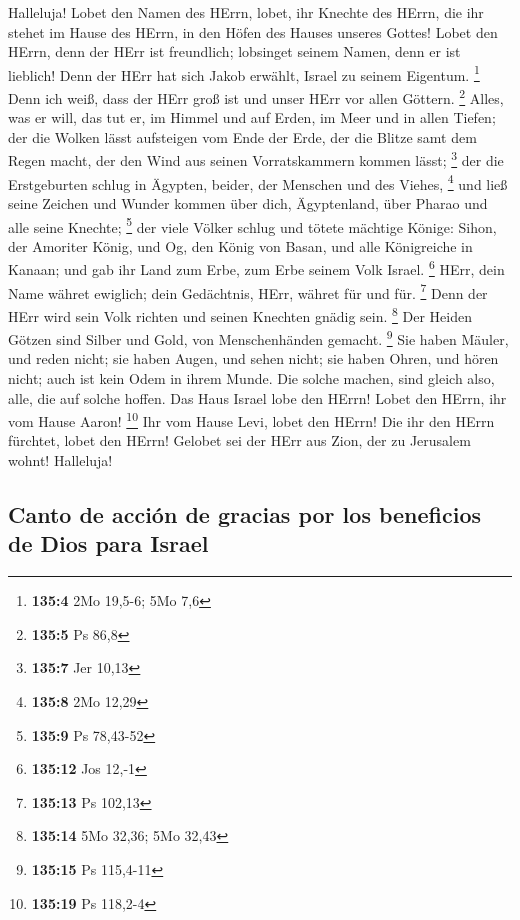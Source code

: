  Halleluja! Lobet den Namen des HErrn, lobet, ihr Knechte
des HErrn,  die ihr stehet im Hause des HErrn, in den
Höfen des Hauses unseres Gottes!  Lobet den HErrn, denn
der HErr ist freundlich; lobsinget seinem Namen, denn er ist lieblich!
 Denn der HErr hat sich Jakob erwählt, Israel zu seinem
Eigentum. \footnote{\textbf{135:4} 2Mo 19,5-6; 5Mo 7,6} 
Denn ich weiß, dass der HErr groß ist und unser HErr vor allen Göttern.
\footnote{\textbf{135:5} Ps 86,8}  Alles, was er will, das
tut er, im Himmel und auf Erden, im Meer und in allen Tiefen;
 der die Wolken lässt aufsteigen vom Ende der Erde, der
die Blitze samt dem Regen macht, der den Wind aus seinen Vorratskammern
kommen lässt; \footnote{\textbf{135:7} Jer 10,13}  der die
Erstgeburten schlug in Ägypten, beider, der Menschen und des Viehes,
\footnote{\textbf{135:8} 2Mo 12,29}  und ließ seine
Zeichen und Wunder kommen über dich, Ägyptenland, über Pharao und alle
seine Knechte; \footnote{\textbf{135:9} Ps 78,43-52}  der
viele Völker schlug und tötete mächtige Könige:  Sihon,
der Amoriter König, und Og, den König von Basan, und alle Königreiche in
Kanaan;  und gab ihr Land zum Erbe, zum Erbe seinem Volk
Israel. \footnote{\textbf{135:12} Jos 12,-1}  HErr, dein
Name währet ewiglich; dein Gedächtnis, HErr, währet für und für.
\footnote{\textbf{135:13} Ps 102,13}  Denn der HErr wird
sein Volk richten und seinen Knechten gnädig sein. \footnote{\textbf{135:14}
  5Mo 32,36; 5Mo 32,43}  Der Heiden Götzen sind Silber
und Gold, von Menschenhänden gemacht. \footnote{\textbf{135:15} Ps
  115,4-11}  Sie haben Mäuler, und reden nicht; sie haben
Augen, und sehen nicht;  sie haben Ohren, und hören
nicht; auch ist kein Odem in ihrem Munde.  Die solche
machen, sind gleich also, alle, die auf solche hoffen. 
Das Haus Israel lobe den HErrn! Lobet den HErrn, ihr vom Hause Aaron!
\footnote{\textbf{135:19} Ps 118,2-4}  Ihr vom Hause
Levi, lobet den HErrn! Die ihr den HErrn fürchtet, lobet den HErrn!
 Gelobet sei der HErr aus Zion, der zu Jerusalem wohnt!
Halleluja!

\hypertarget{canto-de-acciuxf3n-de-gracias-por-los-beneficios-de-dios-para-israel}{%
\subsection{Canto de acción de gracias por los beneficios de Dios para
Israel}\label{canto-de-acciuxf3n-de-gracias-por-los-beneficios-de-dios-para-israel}}

